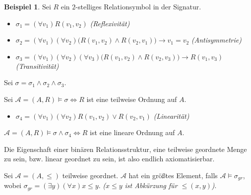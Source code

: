 \documentclass{article}
\theoremstyle{definition}
\newtheorem*{bsp}{Beispiel}
\theoremstyle{plain}
\newcommand{\m}[1]{\mathcal{#1}}
\begin{document}
    \begin{bsp}
        Sei $ R $ ein $ 2 $-stelliges Relationsymbol in der Signatur.
        \begin{itemize}
            \item $ \sigma_1 = (\forall v_1) R(v_1, v_2) $ \hfill \textit{(Reflexivität)}
            \item $ \sigma_2 = (\forall v_1) (\forall v_2) \big(R(v_1, v_2) \land R(v_2, v_1)\big) \rightarrow v_1 = v_2 $ \hfill \textit{(Antisymmetrie)}
            \item $ \sigma_3 = (\forall v_1) (\forall v_2) (\forall v_3) \big(R(v_1, v_2) \land R(v_2, v_3)\big) \rightarrow R(v_1, v_3) $ \hfill \textit{(Transitivität)}
        \end{itemize}

        Sei $ \sigma = \sigma_1 \land \sigma_2 \land \sigma_3 $.

        Sei $ \m{A} = (A, R) \models \sigma \Leftrightarrow R $  ist eine teilweise Ordnung auf $ A $.

        \begin{itemize}
            \item $ \sigma_4 = (\forall v_1) (\forall v_2) R(v_1, v_2) \lor R(v_2, v_1) $ \hfill \textit{(Linearität)}
        \end{itemize}

        $ \m{A} = (A, R) \models \sigma \land \sigma_4 \Leftrightarrow R $ ist eine lineare Ordnung auf $ A $.

        Die Eigenschaft einer binären Relationsstruktur, eine teilweise geordnete Menge zu sein, bzw. linear geordnet zu sein, ist also endlich axiomatisierbar.

        Sei $ \m{A} = (A, \leq) $ teilweise geordnet.
        $ \m{A} $ hat ein größtes Element, falls $ \m{A} \models \sigma_{gr} $, wobei $ \sigma_{gr} = (\exists y) (\forall x) x \leq y $. \textit{($ x \leq y $ ist Abkürzung für $ \leq(x, y) $)}.
    \end{bsp}
\end{document}
